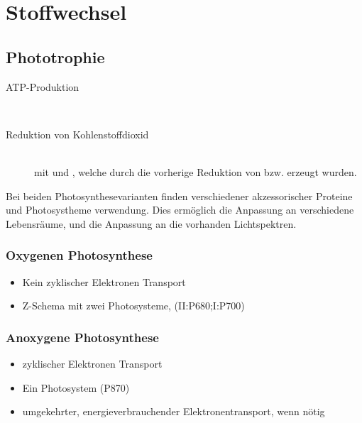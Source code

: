 \section{Stoffwechsel}
\label{sec:stoffwechsel}
\subsection{Phototrophie}
\begin{description}
	\item[ATP-Produktion]	\hfill \\
	\item[Reduktion von Kohlenstoffdioxid]	\hfill	\\
		mit  und ,
		welche durch die vorherige Reduktion von  bzw.  erzeugt wurden.
\end{description}
	Bei beiden Photosynthesevarianten finden
	verschiedener akzessorischer Proteine und Photosystheme verwendung.
	Dies ermöglich die Anpassung an verschiedene Lebensräume,
	und die Anpassung an die vorhanden Lichtspektren.

\subsubsection{Oxygenen Photosynthese}
	\begin{itemize}
		\item Kein zyklischer Elektronen Transport
		\item Z-Schema mit zwei Photosysteme, (II:P680;I:P700)
	\end{itemize}

\subsubsection{Anoxygene Photosynthese}
	\begin{itemize}
		\item zyklischer Elektronen Transport
		\item Ein Photosystem (P870)
		\item umgekehrter, energieverbrauchender Elektronentransport,
			wenn  nötig
	\end{itemize}

